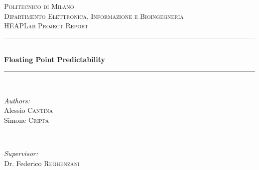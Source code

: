 \begin{titlepage}

\newcommand{\HRule}{\rule{\linewidth}{0.5mm}} %

\center %
 

\textsc{\LARGE Politecnico di Milano}\\[1.5cm] %
\textsc{\Large Dipartimento Elettronica, Informazione e Bioingegneria}\\[0.5cm] %
\textsc{\large HEAPLab Project Report}\\[0.5cm] %


\HRule \\[0.4cm]
{ \huge \bfseries Floating Point Predictability}\\[0.4cm] %
\HRule \\[1.5cm]
 

\begin{minipage}{0.4\textwidth}
\begin{flushleft} \large
\emph{Authors:}\\
Alessio \textsc{Cantina}\\ %
Simone \textsc{Crippa}
\end{flushleft}
\end{minipage}
~
\begin{minipage}{0.5\textwidth}
\begin{flushright} \large
\emph{Supervisor:} \\
Dr. Federico \textsc{Reghenzani} %
\end{flushright}
\end{minipage}\\[1cm]


\end{titlepage}
